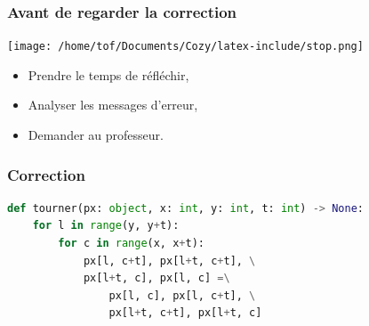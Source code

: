 \documentclass[svgnames,11pt]{beamer}
\begin{document}
\begin{frame}
    \frametitle{Avant de regarder la correction}
    \begin{center}
        \centering
        \texttt{[image: /home/tof/Documents/Cozy/latex-include/stop.png]}
    \end{center}
    {\Large
    \begin{itemize}
        \item Prendre le temps de réfléchir,
        \item Analyser les messages d'erreur,
        \item Demander au professeur.
    \end{itemize}
    }
\end{frame}
\begin{frame}[fragile]
    \frametitle{Correction}

    \begin{center}
        \begin{lstlisting}[language=Python , basicstyle=\ttfamily\small, xleftmargin=0em, xrightmargin=0em]
def tourner(px: object, x: int, y: int, t: int) -> None:
    for l in range(y, y+t):
        for c in range(x, x+t):
            px[l, c+t], px[l+t, c+t], \
            px[l+t, c], px[l, c] =\
                px[l, c], px[l, c+t], \
                px[l+t, c+t], px[l+t, c]
\end{lstlisting}
        \label{CODE}
    \end{center}

\end{frame}
\end{document}
